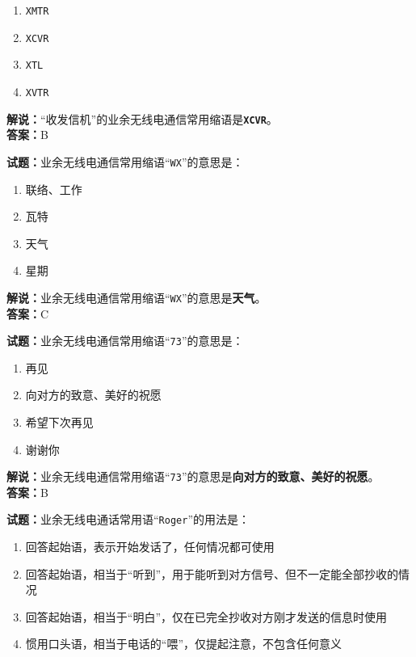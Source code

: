 \documentclass{ctexbook}
\begin{document}
\begin{enumerate}[leftmargin=3em]
	\item \texttt{XMTR}
	\item \texttt{XCVR}
	\item \texttt{XTL}
	\item \texttt{XVTR}
\end{enumerate}

\noindent\textbf{解说：}“收发信机”的业余无线电通信常用缩语是\texttt{\textbf{XCVR}}。\\\noindent\textbf{答案：}B


\bigskip


\noindent\textbf{试题：}业余无线电通信常用缩语“\texttt{WX}”的意思是：

\begin{enumerate}[leftmargin=3em]
	\item 联络、工作
	\item 瓦特
	\item 天气
	\item 星期
\end{enumerate}

\noindent\textbf{解说：}业余无线电通信常用缩语“\texttt{WX}”的意思是\textbf{天气}。\\\noindent\textbf{答案：}C


\bigskip


\noindent\textbf{试题：}业余无线电通信常用缩语“\texttt{73}”的意思是：

\begin{enumerate}[leftmargin=3em]
	\item 再见
	\item 向对方的致意、美好的祝愿
	\item 希望下次再见
	\item 谢谢你
\end{enumerate}

\noindent\textbf{解说：}业余无线电通信常用缩语“\texttt{73}”的意思是\textbf{向对方的致意、美好的祝愿}。\\\noindent\textbf{答案：}B


\bigskip


\noindent\textbf{试题：}业余无线电通话常用语“\texttt{Roger}”的用法是：

\begin{enumerate}[leftmargin=3em]
	\item 回答起始语，表示开始发话了，任何情况都可使用
	\item 回答起始语，相当于“听到”，用于能听到对方信号、但不一定能全部抄收的情况
	\item 回答起始语，相当于“明白”，仅在已完全抄收对方刚才发送的信息时使用
	\item 惯用口头语，相当于电话的“喂”，仅提起注意，不包含任何意义
\end{enumerate}
\end{document}
